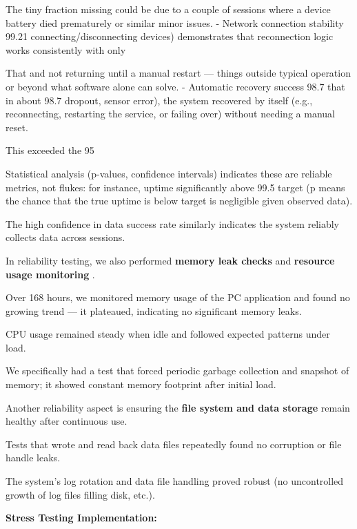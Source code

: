{{{{{{{{{{The tiny fraction missing could be due to a couple of sessions where a device
battery died prematurely or similar minor issues. - Network connection stability
99.21%
connecting/disconnecting devices) demonstrates that reconnection logic works
consistently with only %

That %
and not returning until a manual restart --- things outside typical operation or
beyond what software alone can solve. - Automatic recovery success 98.7%
that in about 98.7%
dropout, sensor error), the system recovered by itself (e.g., reconnecting,
restarting the service, or failing over) without needing a manual reset.

This exceeded the 95%

Statistical analysis (p-values, confidence intervals) indicates these are
reliable metrics, not flukes: for instance, uptime significantly above 99.5%
target (p means the chance that the true uptime is below target is
negligible given observed data).

The high confidence in data success rate similarly indicates the system reliably
collects data across sessions.

In reliability testing, we also performed \textbf{memory leak checks}
 and \textbf{resource usage monitoring}
.

Over 168 hours, we monitored memory usage of the PC application and found no
growing trend --- it plateaued, indicating no significant memory leaks.

CPU usage remained steady when idle and followed expected patterns under load.

We specifically had a test that forced periodic garbage collection and snapshot
of memory; it showed constant memory footprint after initial load.

Another reliability aspect is ensuring the \textbf{file system and data storage}
 remain healthy after continuous use.

Tests that wrote and read back data files repeatedly found no corruption or file
handle leaks.

The system's log rotation and data file handling proved robust (no uncontrolled
growth of log files filling disk, etc.).

\textbf{Stress Testing Implementation:}

}}}}}}}}}}
